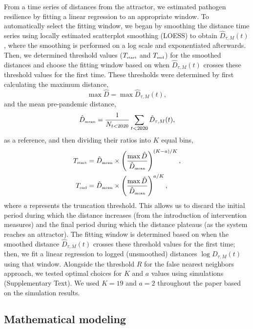 \documentclass[12pt]{article}
\newcommand{\comment}{\showcomment}
\newcommand{\showcomment}[3]{\textcolor{#1}{\textbf{[#2: }\textsl{#3}\textbf{]}}}
\newcommand{\swp}[1]{\comment{magenta}{SWP}{#1}}
\newcommand{\tsub}[2]{#1_{{\textrm{\tiny #2}}}}
\begin{document}
From a time series of distances from the attractor, we estimated pathogen resilience by fitting a linear regression to an appropriate window.
To automatically select the fitting window, we began by smoothing the distance time series using locally estimated scatterplot smoothing (LOESS) to obtain $\hat{D}_{\tau,M}(t)$, where the smoothing is performed on a log scale and exponentiated afterwards.
Then, we determined threshold values ($\tsub{T}{start}$ and $\tsub{T}{end}$) for the smoothed distances and choose the fitting window based on when $\hat{D}_{\tau,M}(t)$ crosses these threshold values for the first time.
These thresholds were determined by first calculating the maximum distance,
\begin{equation}
\max \hat{D} = \max \hat{D}_{\tau,M}(t),
\end{equation}
and the mean pre-pandemic distance,
\begin{equation}
\tsub{\hat{D}}{mean} = \frac{1}{N_{t<2020}} \sum_{t < 2020} \hat{D}_{\tau,M}(t),
\end{equation}
as a reference, and then dividing their ratios into $K$ equal bins,
\begin{align}
\tsub{T}{start} &= \tsub{\hat{D}}{mean} \times \left(\frac{\max \hat{D}}{\tsub{\hat{D}}{mean}} \right)^{(K-a)/K},\\
\tsub{T}{end} &= \tsub{\hat{D}}{mean} \times \left(\frac{\max \hat{D}}{\tsub{\hat{D}}{mean}} \right)^{a/K},
\end{align}
where $a$ represents the truncation threshold.
This allows us to discard the initial period during which the distance increases (from the introduction of intervention measures) and the final period during which the distance plateaus (as the system reaches an attractor).
The fitting window is determined based on when the smoothed distance $\hat{D}_{\tau,M}(t)$ crosses these threshold values for the first time; then, we fit a linear regression to logged (unsmoothed) distances $\log D_{\tau,M}(t)$ using that window.
Alongside the threshold $R$ for the false nearest neighbors approach, we tested optimal choices for $K$ and $a$ values using simulations (Supplementary Text).
We used $K=19$ and $a=2$ throughout the paper based on the simulation results.

\subsection*{Mathematical modeling}
\end{document}
